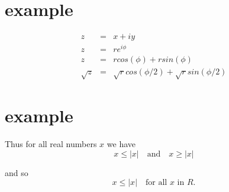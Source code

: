 \documentclass[12pt]{article}
\newcommand{\beqa}{\begin{eqnarray}}
\newcommand{\eeqa}{\end{eqnarray}}
\newcommand{\no}{\nonumber}
\begin{document}
\section{example}
	\beqa
	\label{eq1}
	z &=& x + iy\\
	\label{eq2}
	z &=& re^{i \phi}  \no\\   %
	z &=& r cos(\phi) + r sin(\phi)\\
	\sqrt{z} &=& \sqrt{r} cos(\phi/2) + \sqrt{r}  sin(\phi/2)
	\eeqa


\section{ example}

	Thus for all real numbers $x$ we have
	\begin{equation*}
    x\le|x|\quad\text{and}\quad x\ge|x|
	\end{equation*}
	
	and so
	\begin{equation*}
    x\le|x|\quad\text{for all $x$ in $R$}.
	\end{equation*}
\end{document}
